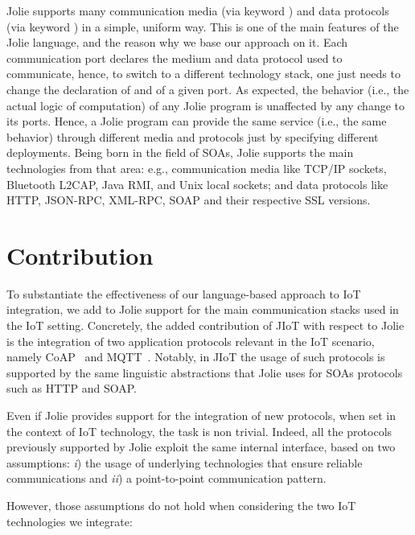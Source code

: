 Jolie supports many communication media (via keyword
) and data protocols (via keyword ) in a simple,
uniform way. This is one of the main features of the Jolie language, and the
reason why we base our approach on it.
%
Each communication port declares the medium and data protocol used to
communicate, hence, to switch to a different technology stack, one just needs
to change the declaration of  and  of a given
port. As expected, the behavior (i.e., the actual logic of computation) of any
Jolie program is unaffected by any change to its ports. Hence, a Jolie program
can provide the same service (i.e., the same behavior) through different media
and protocols just by specifying different deployments. Being born in the field
of SOAs, Jolie supports the main technologies from that area: e.g.,
communication media like TCP/IP sockets, Bluetooth L2CAP, Java RMI, and Unix
local sockets; and data protocols like HTTP, JSON-RPC, XML-RPC, SOAP and their
respective SSL versions.

\section{Contribution}
\label{sec:contribution}
To substantiate the effectiveness of our language-based approach to IoT
integration, we add to Jolie support for the main communication stacks used in the
IoT setting. Concretely, the added contribution of JIoT with respect to Jolie
is the integration of two application protocols relevant in the IoT scenario,
namely CoAP~\cite{doi:10.17487/RFC7252,coap} and MQTT~\cite{mqtt-v3.1.1,mqtt}.
Notably, in JIoT the usage of such protocols is supported by the same
linguistic abstractions that Jolie uses for SOAs protocols such as HTTP and
SOAP.

Even if Jolie provides support for the integration of new protocols, when set
in the context of IoT technology, the task is non trivial. Indeed, all the
protocols previously supported by Jolie exploit the same internal interface,
based on two assumptions: \emph{i}) the usage of underlying technologies that
ensure reliable communications and \emph{ii}) a point-to-point communication
pattern.

However, those assumptions do not hold when considering the two IoT technologies we integrate:

